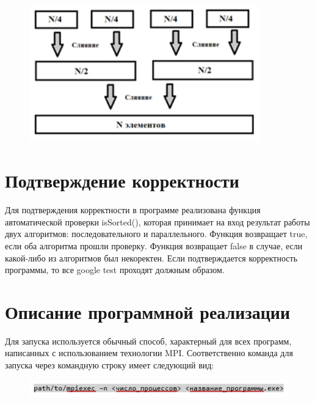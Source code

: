 \documentclass{report}
\begin{document}
\begin{figure}[htp]
    \centering
    \includegraphics[width=10cm]{image9}
    \label{fig:galaxy}
\end{figure}

\newpage

\section*{Подтверждение корректности}

\par Для подтверждения корректности в программе реализована функция автоматической проверки isSorted(), которая принимает на вход результат работы двух алгоритмов: последовательного и параллельного. Функция возвращает true, если оба алгоритма прошли проверку. Функция возвращает false в случае, если какой-либо из алгоритмов был некоректен. Если подтверждается корректность программы, то все google test проходят должным образом.

\newpage
\section*{Описание программной реализации}

\par Для запуска используется обычный способ, характерный для всех программ, написанных с использованием технологии MPI. Соответственно команда для запуска через командную строку имеет следующий вид:

\begin{figure}[htp]
    \centering
    \includegraphics[width=15cm]{put}
    \label{fig:galaxy}
\end{figure}
\end{document}
